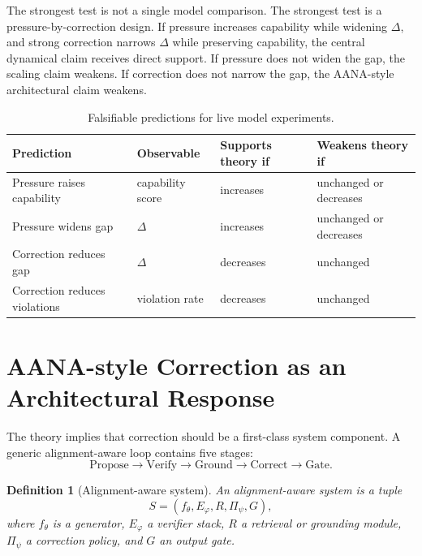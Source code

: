 \documentclass[11pt]{article}
\newtheorem{definition}{Definition}[section]
\begin{document}
The strongest test is not a single model comparison. The strongest test is a pressure-by-correction design. If pressure increases capability while widening \(\Delta\), and strong correction narrows \(\Delta\) while preserving capability, the central dynamical claim receives direct support. If pressure does not widen the gap, the scaling claim weakens. If correction does not narrow the gap, the AANA-style architectural claim weakens.

\begin{table}[h]
\centering
\begin{tabular}{llll}
\toprule
Prediction & Observable & Supports theory if & Weakens theory if \\
\midrule
Pressure raises capability & capability score & increases & unchanged or decreases \\
Pressure widens gap & \(\Delta\) & increases & unchanged or decreases \\
Correction reduces gap & \(\Delta\) & decreases & unchanged \\
Correction reduces violations & violation rate & decreases & unchanged \\
\bottomrule
\end{tabular}
\caption{Falsifiable predictions for live model experiments.}
\label{tab:falsifiable}
\end{table}


\section{AANA-style Correction as an Architectural Response}

The theory implies that correction should be a first-class system component. A generic alignment-aware loop contains five stages:
\[
\text{Propose}\to\text{Verify}\to\text{Ground}\to\text{Correct}\to\text{Gate}.
\]

\begin{definition}[Alignment-aware system]
An alignment-aware system is a tuple
\[
S=(f_\theta,E_\varphi,R,\Pi_\psi,G),
\]
where \(f_\theta\) is a generator, \(E_\varphi\) a verifier stack, \(R\) a retrieval or grounding module, \(\Pi_\psi\) a correction policy, and \(G\) an output gate.
\end{definition}
\end{document}
